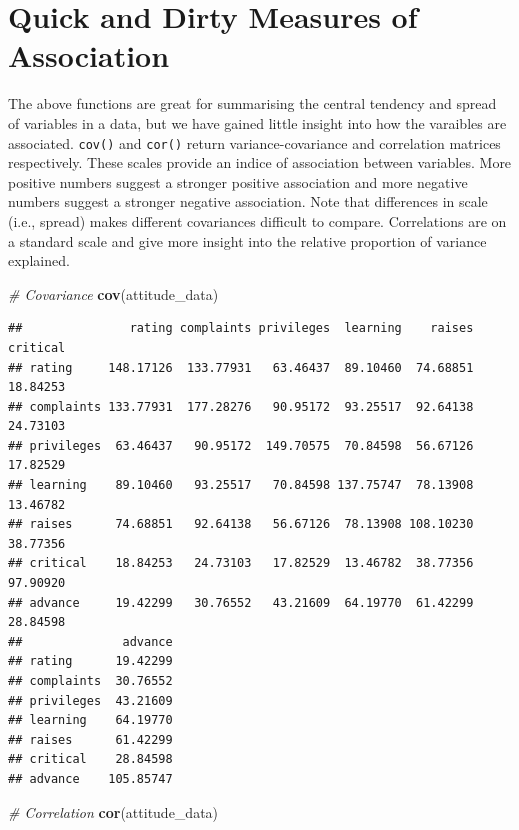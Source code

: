 \documentclass[]{book}
\newenvironment{Shaded}{\begin{snugshade}}{\end{snugshade}}
\newcommand{\CommentTok}[1]{\textcolor[rgb]{0.56,0.35,0.01}{\textit{#1}}}
\newcommand{\KeywordTok}[1]{\textcolor[rgb]{0.13,0.29,0.53}{\textbf{#1}}}
\newcommand{\NormalTok}[1]{#1}
\theoremstyle{definition}
\theoremstyle{definition}
\theoremstyle{definition}
\theoremstyle{remark}
\begin{document}
\hypertarget{quick-and-dirty-measures-of-association}{%
\section{Quick and Dirty Measures of Association}\label{quick-and-dirty-measures-of-association}}

The above functions are great for summarising the central tendency and spread of variables in a data, but we have gained little insight into how the varaibles are associated. \texttt{cov()} and \texttt{cor()} return variance-covariance and correlation matrices respectively. These scales provide an indice of association between variables. More positive numbers suggest a stronger positive association and more negative numbers suggest a stronger negative association. Note that differences in scale (i.e., spread) makes different covariances difficult to compare. Correlations are on a standard scale and give more insight into the relative proportion of variance explained.

\begin{Shaded}
\begin{Highlighting}[]
\CommentTok{# Covariance}
\KeywordTok{cov}\NormalTok{(attitude_data)}
\end{Highlighting}
\end{Shaded}

\begin{verbatim}
##               rating complaints privileges  learning    raises critical
## rating     148.17126  133.77931   63.46437  89.10460  74.68851 18.84253
## complaints 133.77931  177.28276   90.95172  93.25517  92.64138 24.73103
## privileges  63.46437   90.95172  149.70575  70.84598  56.67126 17.82529
## learning    89.10460   93.25517   70.84598 137.75747  78.13908 13.46782
## raises      74.68851   92.64138   56.67126  78.13908 108.10230 38.77356
## critical    18.84253   24.73103   17.82529  13.46782  38.77356 97.90920
## advance     19.42299   30.76552   43.21609  64.19770  61.42299 28.84598
##              advance
## rating      19.42299
## complaints  30.76552
## privileges  43.21609
## learning    64.19770
## raises      61.42299
## critical    28.84598
## advance    105.85747
\end{verbatim}

\begin{Shaded}
\begin{Highlighting}[]
\CommentTok{# Correlation}
\KeywordTok{cor}\NormalTok{(attitude_data)}
\end{Highlighting}
\end{Shaded}
\end{document}
